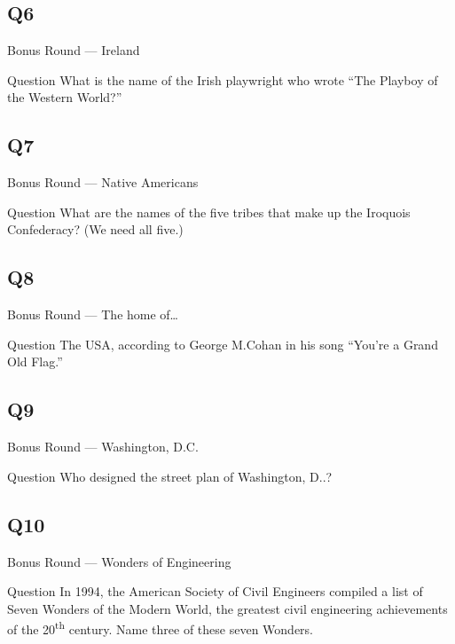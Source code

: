 \documentclass[11pt]{beamer}
\begin{document}
\subsection*{Q6}
\begin{frame}[t]{Bonus Round --- Ireland}
\vspace{-0.5em}
\begin{block}{Question}
What is the name of the Irish playwright who wrote ``The Playboy of the Western World?''
\end{block}
\end{frame}
\subsection*{Q7}
\begin{frame}[t]{Bonus Round --- Native Americans}
\vspace{-0.5em}
\begin{block}{Question}
What are the names of the five tribes that make up the Iroquois Confederacy?  (We need all five.)
\end{block}
\end{frame}
\subsection*{Q8}
\begin{frame}[t]{Bonus Round --- The home of\ldots{}}
\vspace{-0.5em}
\begin{block}{Question}
The USA, according to George M.\@ Cohan in his song ``You're a Grand Old Flag.''
\end{block}
\end{frame}
\subsection*{Q9}
\begin{frame}[t]{Bonus Round --- Washington, D.C.}
\vspace{-0.5em}
\begin{block}{Question}
Who designed the street plan of Washington, D.\@C.\@?
\end{block}
\end{frame}
\subsection*{Q10}
\begin{frame}[t]{Bonus Round --- Wonders of Engineering}
\vspace{-0.5em}
\begin{block}{Question}
In 1994, the American Society of Civil Engineers compiled a list of Seven Wonders of the Modern World, the greatest civil engineering achievements of the 20\textsuperscript{th} century. Name three of these seven Wonders.
\end{block}
\end{frame}
\end{document}
